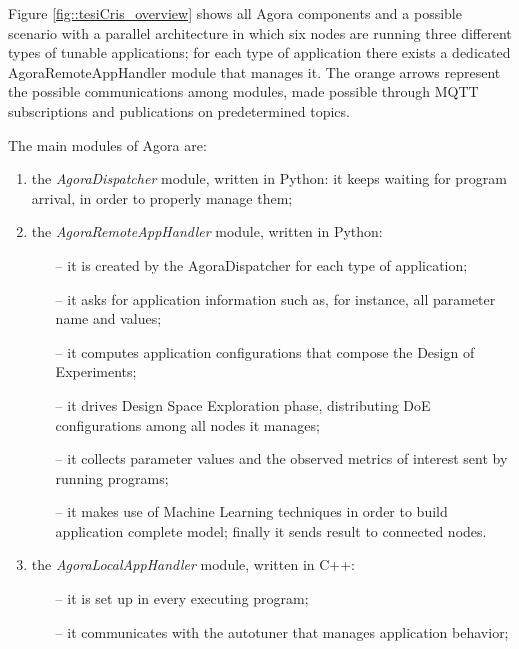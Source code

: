 Figure \ref{fig::tesiCris_overview} shows all Agora components and a possible scenario with a parallel architecture in which six nodes are running three different types of tunable applications; for each type of application there exists a dedicated AgoraRemoteAppHandler module that manages it. The orange arrows represent the possible communications among modules, made possible through MQTT subscriptions and publications on predetermined topics.

The main modules of Agora are:

\begin{enumerate}

    \item the \textit{AgoraDispatcher} module, written in Python: it keeps waiting for program arrival, in order to properly manage them;
    
    \item the \textit{AgoraRemoteAppHandler} module, written in Python:
	\begin{itemize}	
		\item [--] it is created by the AgoraDispatcher for each type of application;

		\item [--] it asks for application information such as, for instance, all parameter name and values;

		\item [--] it computes application configurations that compose the Design of Experiments;

		\item [--] it drives Design Space Exploration phase, distributing DoE configurations among all nodes it manages;

		\item [--] it collects parameter values and the observed metrics of interest sent by running programs;

		\item [--] it makes use of Machine Learning techniques in order to build application complete model; finally it sends result to connected nodes.
	\end{itemize}
    
    \item the \textit{AgoraLocalAppHandler} module, written in C++:
	\begin{itemize}
		\item [--] it is set up in every executing program;

		\item [--] it communicates with the autotuner that manages application behavior;


\end{itemize}
\end{enumerate}
